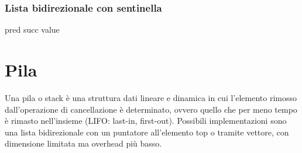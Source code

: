 \subsubsection{Lista bidirezionale con sentinella}
\begin{algorithm}

\DontPrintSemicolon
{}



\caption{\protect\List}

\begin{multicols}{2}
\List pred   
\List succ   
\Item value 
\List\Space {}
\Boolean\Space{}
\Pos\Space{}
\Pos\Space{}
\Pos\Space{}
\Pos\Space{}
\Boolean\Space{}
\Item\Space{}
\Item\Space{}
\Pos\Space{}
\Pos\Space{}
\end{multicols}
\end{algorithm}
\section{Pila}
Una pila o stack \`e una struttura dati lineare e dinamica in cui l'elemento rimosso dall'operazione di cancellazione \`e determinato, ovvero quello che 
per meno tempo \`e rimasto nell'insieme (LIFO: last-in, first-out). Possibili implementazioni sono una lista bidirezionale con un puntatore all'elemento 
top o tramite vettore, con dimensione limitata ma overhead pi\`u basso. 
